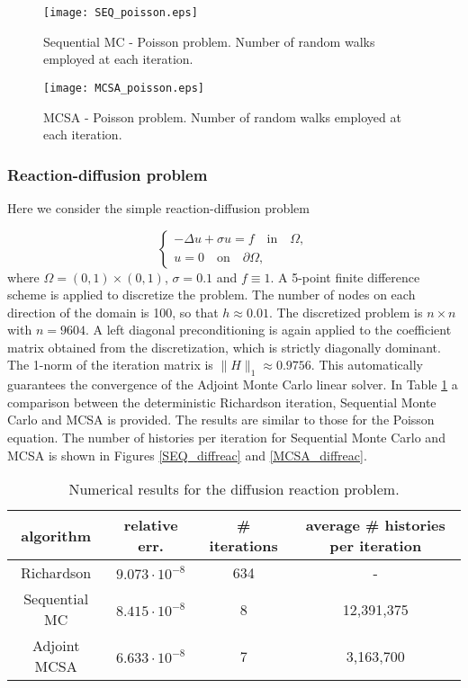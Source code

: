\documentclass[final,leqno,onefignum,onetabnum]{siamltex1213}
\begin{document}
\begin{figure}
  \centering
    \texttt{[image: SEQ\_poisson.eps]}
\vspace{-0.3in}
    \caption{Sequential MC - Poisson problem. Number of random walks employed
at each iteration.}
\label{SEQ_poisson}
\end{figure}


\begin{figure}
  \centering
    \texttt{[image: MCSA\_poisson.eps]}
\vspace{-0.3in}
      \caption{MCSA - Poisson problem. Number of random walks employed at each
iteration.}
\label{MCSA_poisson}
\end{figure}



\subsubsection{Reaction-diffusion problem}

Here we consider the simple reaction-diffusion problem

\begin{equation}
\begin{cases}
 -\Delta u +\sigma u= f \quad \text{in}\quad \Omega, \\
 u=0\quad \text{on} \quad \partial\Omega,
 \end{cases}
\end{equation}
where $\Omega=(0,1)\times (0,1)$, $\sigma=0.1$ and $f\equiv 1$.
A 5-point finite difference scheme is applied to discretize the problem.
The number of nodes
on each direction of the domain is 100, so that $h\approx 0.01$. The
discretized problem is $n\times n$ with $n=9604$. A left
diagonal preconditioning is again applied to
the coefficient matrix obtained from the discretization, which
is strictly diagonally dominant. The 1-norm of the
iteration matrix is $\lVert H\rVert_1\approx 0.9756$. This automatically
guarantees the convergence of the Adjoint Monte Carlo linear solver.
In Table \ref{DR_results} a comparison between the deterministic
Richardson iteration, Sequential Monte Carlo and MCSA is provided.
The results are similar to those for the Poisson equation.
The number of histories per iteration for Sequential Monte Carlo and MCSA
is shown in Figures \ref{SEQ_diffreac} and \ref{MCSA_diffreac}.

\begin{table}[!t]
\centering
\hspace*{-0.8cm}
\begin{tabular}{|c|c|c|c|}
\hline
algorithm & relative err.& \# iterations & average \# histories per iteration\\
\hline
 Richardson & $9.073\cdot 10^{-8}$ & 634 & - \\
\hline
 Sequential MC & $8.415 \cdot 10^{-8}$ &  8 & 12,391,375\\
 \hline
 Adjoint MCSA & $6.633 \cdot 10^{-8}$ &  7 & 3,163,700\\
\hline
\end{tabular}
\caption{Numerical results for the diffusion reaction problem.}
\label{DR_results}
\end{table}
\end{document}
